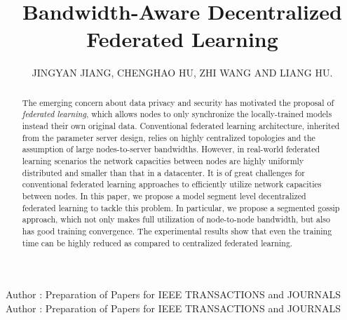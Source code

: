 \documentclass{ieeeaccess}
\begin{document}



\title{Bandwidth-Aware Decentralized Federated Learning}
\author{\uppercase{Jingyan Jiang},
\uppercase{Chenghao Hu, Zhi Wang and Liang Hu}.}
\address[1]{College of Computer Science and Technology, Jilin University (e-mail: jiangjy14@mails.jlu.edu.cn)}
\address[2]{Graduate School at Shenzhen, Tsinghua University (huch16@mails.tsinghua.edu.cn)}
\address[3]{Graduate School at Shenzhen, Tsinghua University (wangzhi@sz.tsinghua.edu.cn)}
\address[4]{College of Computer Science and Technology, Jilin University (hul@jlu.edu.cn)}


\markboth
{Author \headeretal: Preparation of Papers for IEEE TRANSACTIONS and JOURNALS}
{Author \headeretal: Preparation of Papers for IEEE TRANSACTIONS and JOURNALS}


\begin{abstract}
The emerging concern about data privacy and security has motivated the proposal of \emph{federated learning}, which allows nodes to only synchronize the locally-trained models instead their own original data. Conventional federated learning architecture, inherited from the parameter server design, relies on highly centralized topologies and the assumption of large nodes-to-server bandwidths. However, in real-world federated learning scenarios the network capacities between nodes are highly uniformly distributed and smaller than that in a datacenter. It is of great challenges for conventional federated learning approaches to efficiently utilize network capacities between nodes. In this paper, we propose a model segment level decentralized federated learning to tackle this problem. In particular, we propose a segmented gossip approach, which not only makes full utilization of node-to-node bandwidth, but also has good training convergence. The experimental results show that even the training time can be highly reduced as compared to centralized federated learning.
\end{abstract}
\end{document}
